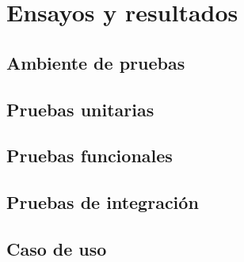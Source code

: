 \chapter{Ensayos y resultados} %

\label{Chapter4}



\section{Ambiente de pruebas}
\label{sec:ambiente_pruebas}

\section{Pruebas unitarias}
\label{sec:pruebas_unitarias}

\section{Pruebas funcionales}
\label{sec:pruebas_funcionales}

\section{Pruebas de integración}
\label{sec:pruebas_integracion}

\section{Caso de uso}
\label{sec:caso_uso}

